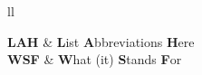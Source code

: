 \documentclass[
11pt, %
english, %
singlespacing, %
headsepline, %
]{MastersDoctoralThesis} %
\author{Jane \textsc{Smith}} %
\begin{document}
\frontmatter %

\pagestyle{plain} %












\tableofcontents %
\setcounter{tocdepth}{2} %
\listoffigures %

\listoftables %


\begin{abbreviations}{ll} %

\textbf{LAH} & \textbf{L}ist \textbf{A}bbreviations \textbf{H}ere\\
\textbf{WSF} & \textbf{W}hat (it) \textbf{S}tands \textbf{F}or\\

\end{abbreviations}
\end{document}
